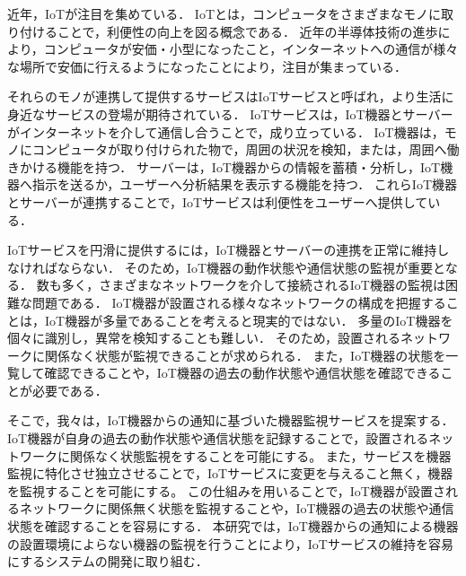 近年，IoTが注目を集めている．
IoTとは，コンピュータをさまざまなモノに取り付けることで，利便性の向上を図る概念である．
近年の半導体技術の進歩により，コンピュータが安価・小型になったこと，インターネットへの通信が様々な場所で安価に行えるようになったことにより，注目が集まっている．
\medskip

それらのモノが連携して提供するサービスはIoTサービスと呼ばれ，より生活に身近なサービスの登場が期待されている．
IoTサービスは，IoT機器とサーバーがインターネットを介して通信し合うことで，成り立っている．
IoT機器は，モノにコンピュータが取り付けられた物で，周囲の状況を検知，または，周囲へ働きかける機能を持つ．
サーバーは，IoT機器からの情報を蓄積・分析し，IoT機器へ指示を送るか，ユーザーへ分析結果を表示する機能を持つ．
これらIoT機器とサーバーが連携することで，IoTサービスは利便性をユーザーへ提供している．
\medskip

IoTサービスを円滑に提供するには，IoT機器とサーバーの連携を正常に維持しなければならない．
そのため，IoT機器の動作状態や通信状態の監視が重要となる．
数も多く，さまざまなネットワークを介して接続されるIoT機器の監視は困難な問題である．
IoT機器が設置される様々なネットワークの構成を把握することは，IoT機器が多量であることを考えると現実的ではない．
多量のIoT機器を個々に識別し，異常を検知することも難しい．
そのため，設置されるネットワークに関係なく状態が監視できることが求められる．
また，IoT機器の状態を一覧して確認できることや，IoT機器の過去の動作状態や通信状態を確認できることが必要である．
\medskip

そこで，我々は，IoT機器からの通知に基づいた機器監視サービスを提案する．
IoT機器が自身の過去の動作状態や通信状態を記録することで，設置されるネットワークに関係なく状態監視をすることを可能にする。
また，サービスを機器監視に特化させ独立させることで，IoTサービスに変更を与えること無く，機器を監視することを可能にする。
この仕組みを用いることで，IoT機器が設置されるネットワークに関係無く状態を監視することや，IoT機器の過去の状態や通信状態を確認することを容易にする．
本研究では，IoT機器からの通知による機器の設置環境によらない機器の監視を行うことにより，IoTサービスの維持を容易にするシステムの開発に取り組む．
\medskip

